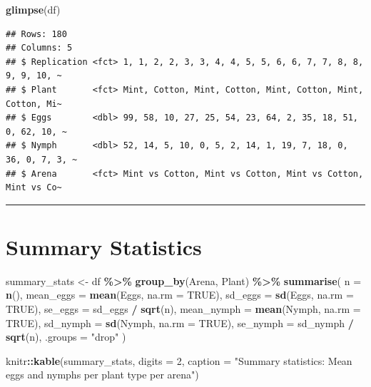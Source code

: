 \documentclass[
]{article}
\newenvironment{Shaded}{\begin{snugshade}}{\end{snugshade}}
\newcommand{\AttributeTok}[1]{\textcolor[rgb]{0.13,0.29,0.53}{#1}}
\newcommand{\ConstantTok}[1]{\textcolor[rgb]{0.56,0.35,0.01}{#1}}
\newcommand{\DecValTok}[1]{\textcolor[rgb]{0.00,0.00,0.81}{#1}}
\newcommand{\FunctionTok}[1]{\textcolor[rgb]{0.13,0.29,0.53}{\textbf{#1}}}
\newcommand{\NormalTok}[1]{#1}
\newcommand{\OtherTok}[1]{\textcolor[rgb]{0.56,0.35,0.01}{#1}}
\newcommand{\SpecialCharTok}[1]{\textcolor[rgb]{0.81,0.36,0.00}{\textbf{#1}}}
\newcommand{\StringTok}[1]{\textcolor[rgb]{0.31,0.60,0.02}{#1}}
\begin{document}
\begin{Shaded}
\begin{Highlighting}[]
\FunctionTok{glimpse}\NormalTok{(df)}
\end{Highlighting}
\end{Shaded}

\begin{verbatim}
## Rows: 180
## Columns: 5
## $ Replication <fct> 1, 1, 2, 2, 3, 3, 4, 4, 5, 5, 6, 6, 7, 7, 8, 8, 9, 9, 10, ~
## $ Plant       <fct> Mint, Cotton, Mint, Cotton, Mint, Cotton, Mint, Cotton, Mi~
## $ Eggs        <dbl> 99, 58, 10, 27, 25, 54, 23, 64, 2, 35, 18, 51, 0, 62, 10, ~
## $ Nymph       <dbl> 52, 14, 5, 10, 0, 5, 2, 14, 1, 19, 7, 18, 0, 36, 0, 7, 3, ~
## $ Arena       <fct> Mint vs Cotton, Mint vs Cotton, Mint vs Cotton, Mint vs Co~
\end{verbatim}

\begin{center}\rule{0.5\linewidth}{0.5pt}\end{center}

\section{Summary Statistics}\label{summary-statistics}

\begin{Shaded}
\begin{Highlighting}[]
\NormalTok{summary\_stats }\OtherTok{\textless{}{-}}\NormalTok{ df }\SpecialCharTok{\%\textgreater{}\%}
  \FunctionTok{group\_by}\NormalTok{(Arena, Plant) }\SpecialCharTok{\%\textgreater{}\%}
  \FunctionTok{summarise}\NormalTok{(}
    \AttributeTok{n          =} \FunctionTok{n}\NormalTok{(),}
    \AttributeTok{mean\_eggs  =} \FunctionTok{mean}\NormalTok{(Eggs,  }\AttributeTok{na.rm =} \ConstantTok{TRUE}\NormalTok{),}
    \AttributeTok{sd\_eggs    =} \FunctionTok{sd}\NormalTok{(Eggs,    }\AttributeTok{na.rm =} \ConstantTok{TRUE}\NormalTok{),}
    \AttributeTok{se\_eggs    =}\NormalTok{ sd\_eggs }\SpecialCharTok{/} \FunctionTok{sqrt}\NormalTok{(n),}
    \AttributeTok{mean\_nymph =} \FunctionTok{mean}\NormalTok{(Nymph, }\AttributeTok{na.rm =} \ConstantTok{TRUE}\NormalTok{),}
    \AttributeTok{sd\_nymph   =} \FunctionTok{sd}\NormalTok{(Nymph,   }\AttributeTok{na.rm =} \ConstantTok{TRUE}\NormalTok{),}
    \AttributeTok{se\_nymph   =}\NormalTok{ sd\_nymph }\SpecialCharTok{/} \FunctionTok{sqrt}\NormalTok{(n),}
    \AttributeTok{.groups    =} \StringTok{"drop"}
\NormalTok{  )}

\NormalTok{knitr}\SpecialCharTok{::}\FunctionTok{kable}\NormalTok{(summary\_stats, }\AttributeTok{digits =} \DecValTok{2}\NormalTok{,}
             \AttributeTok{caption =} \StringTok{"Summary statistics: Mean eggs and nymphs per plant type per arena"}\NormalTok{)}
\end{Highlighting}
\end{Shaded}
\end{document}
